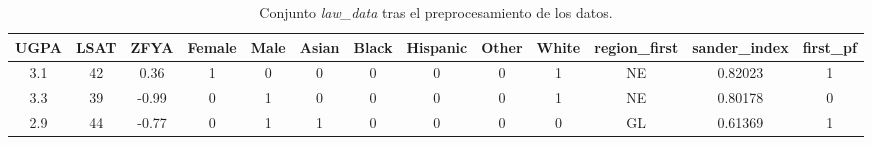 \documentclass[oneside,openright,titlepage,numbers=noenddot,openany,headinclude,footinclude=true,
cleardoublepage=empty,abstractoff,BCOR=5mm,paper=a4,fontsize=12pt,main=spanish]{scrreprt}
\begin{document}
\begin{table}[h]
\centering
\resizebox{16.4cm}{!} {
\begin{tabular}{|c|c|c|c|c|c|c|c|c|c|c|c|c|}
\hline
\multicolumn{1}{|l|}{\textbf{UGPA}} & \multicolumn{1}{l|}{\textbf{LSAT}} & \multicolumn{1}{l|}{\textbf{ZFYA}} & \multicolumn{1}{l|}{\textbf{Female}} & \multicolumn{1}{l|}{\textbf{Male}} & \multicolumn{1}{l|}{\textbf{Asian}} & \multicolumn{1}{l|}{\textbf{Black}} & \multicolumn{1}{l|}{\textbf{Hispanic}} & \multicolumn{1}{l|}{\textbf{Other}} & \multicolumn{1}{l|}{\textbf{White}} & \multicolumn{1}{l|}{\textbf{region\_first}} & \multicolumn{1}{l|}{\textbf{sander\_index}} & \multicolumn{1}{l|}{\textbf{first\_pf}} \\ \hline
3.1                                 & 42                                 & 0.36                               & 1                                    & 0                                  & 0                                   & 0                                   & 0                                      & 0                                   & 1                                   & NE                                          & 0.82023                                     & 1                                       \\ \hline
3.3                                 & 39                                 & -0.99                              & 0                                    & 1                                  & 0                                   & 0                                   & 0                                      & 0                                   & 1                                   & NE                                          & 0.80178                                     & 0                                       \\ \hline
2.9                                 & 44                                 & -0.77                              & 0                                    & 1                                  & 1                                   & 0                                   & 0                                      & 0                                   & 0                                   & GL                                          & 0.61369                                     & 1                                       \\ \hline
\end{tabular}
}
\caption{Conjunto \textit{law\_data} tras el preprocesamiento de los datos.}
\label{tab:conjuntosintratar}
\end{table}
\end{document}
